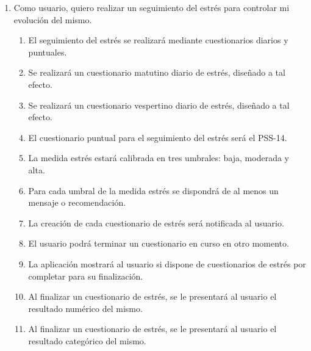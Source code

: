         \begin{enumerate}[series=req-usuario,label=\textbf{\texttt{RU-\arabic*}}]
            \item Como usuario, quiero realizar un seguimiento del estrés para controlar mi evolución del mismo.
            \begin{enumerate}[series=req-funcionales,label=\textbf{\texttt{RF-\arabic*}}]
                \item El seguimiento del estrés se realizará mediante cuestionarios diarios y puntuales.
                \item Se realizará un cuestionario matutino diario de estrés, diseñado a tal efecto.
                \item Se realizará un cuestionario vespertino diario de estrés, diseñado a tal efecto.
                \item El cuestionario puntual para el seguimiento del estrés será el PSS-14.
                \item La medida estrés estará calibrada en tres umbrales: baja, moderada y alta.
                \item Para cada umbral de la medida estrés se dispondrá de al menos un mensaje o recomendación.
                \item La creación de cada cuestionario de estrés será notificada al usuario.
                \item El usuario podrá terminar un cuestionario en curso en otro momento.
                \item La aplicación mostrará al usuario si dispone de cuestionarios de estrés por completar para su finalización.
                \item Al finalizar un cuestionario de estrés, se le presentará al usuario el resultado numérico del mismo.
                \item Al finalizar un cuestionario de estrés, se le presentará al usuario el resultado categórico del mismo.
            \end{enumerate}
        \end{enumerate}
